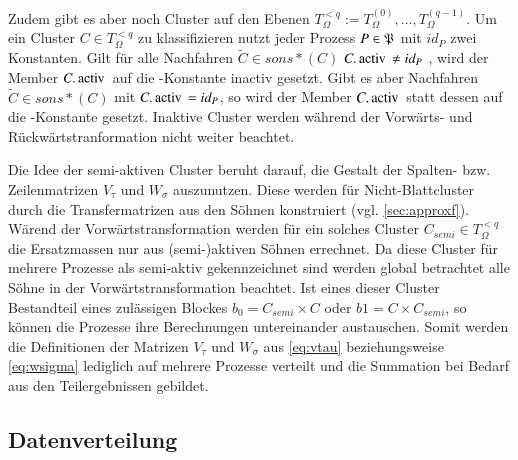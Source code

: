     Zudem gibt es aber noch Cluster auf den Ebenen $T_\Omega^{<q} := T_\Omega^{(0)},\dots,T_\Omega^{(q-1)}$. Um ein Cluster $C \in T_\Omega^{<q}$ zu klassifizieren nutzt jeder Prozess $P \in \mathfrak{P}$
    mit $id_P$ zwei Konstanten. Gilt für alle Nachfahren $\tilde C \in sons*(C)$ $C.\tcode{activ} \neq id_P$  , wird der Member $C.\tcode {activ}$ auf die -Konstante \code inactiv gesetzt. 
    Gibt es aber Nachfahren $\tilde C \in sons*(C)$ mit $C.\tcode{activ} = id_P$, so wird der Member $C.\tcode {activ}$ statt dessen auf die -Konstante  gesetzt. Inaktive
    Cluster werden während der Vorwärts- und Rückwärtstranformation nicht weiter beachtet. 
    
    Die Idee der semi-aktiven Cluster beruht darauf, die Gestalt der Spalten- bzw. Zeilenmatrizen $V_\tau$ und $W_\sigma$ auszunutzen. Diese werden für Nicht-Blattcluster durch die Transfermatrizen 
    aus den Söhnen konstruiert (vgl. \autoref{sec:approxf}). Wärend der Vorwärtstransformation werden für ein solches Cluster $C_{semi} \in T_\Omega^{<q}$ die Ersatzmassen nur aus (semi-)aktiven Söhnen
    errechnet. Da diese Cluster für mehrere Prozesse als semi-aktiv gekennzeichnet sind werden global betrachtet alle Söhne in der Vorwärtstransformation beachtet. Ist eines dieser Cluster Bestandteil
    eines zulässigen Blockes $b_0 = C_{semi} \times C$ oder $b1 = C \times C_{semi}$, so können die Prozesse ihre Berechnungen untereinander austauschen. Somit werden die Definitionen der Matrizen
    $V_\tau$ und $W_\sigma$ aus \autoref{eq:vtau} beziehungsweise \autoref{eq:wsigma} lediglich auf mehrere Prozesse verteilt und die Summation bei Bedarf aus den Teilergebnissen gebildet. 
    
  
  \subsection{Datenverteilung}
  \label{sec:data}
